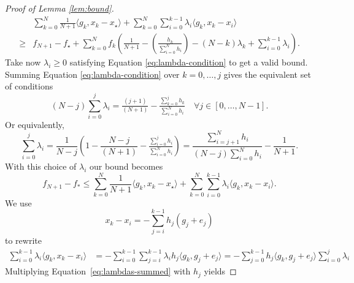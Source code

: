 \documentclass{article}
\begin{document}
\begin{toappendix}
\begin{proof}[Proof of Lemma \ref{lem:bound}]
\begin{align*}
  & \sum_{k=0}^N \frac{1}{N+1} \langle g_k , x_k - x_\star \rangle + \sum_{k=0}^N \sum_{i=0}^{k-1} \lambda_i \langle g_k, x_k-x_i\rangle \\
  \geq & f_{N+1} - f_\star +  \sum_{k=0}^N f_k\left(\frac{1}{N+1} -\left(\frac{h_k}{\sum_{i=0}^N h_i}\right) - (N-k)\lambda_k + \sum_{i=0}^{k-1} \lambda_i  \right).
\end{align*}
Take now $\lambda_i\ge0$ satisfying Equation \eqref{eq:lambda-condition} to get a valid bound.
Summing Equation \eqref{eq:lambda-condition} over $k=0,\dots, j$  gives the equivalent set of conditions
\[
  (N-j) \sum_{i=0}^{j} \lambda_i = \tfrac{(j+1)}{(N+1)} - \tfrac{\sum_{k=0}^{j}h_k}{\sum_{i=0}^N h_i} \quad \forall j\in [0, \dots, N-1].
\]
Or equivalently,
\begin{equation}\label{eq:lambdas-summed}
\sum_{i=0}^{j} \lambda_i = \frac{1}{N-j}\left(1-\frac{N-j}{(N+1)} - \tfrac{\sum_{i=0}^{j}h_i}{\sum_{i=0}^N h_i}\right)=\frac{\sum_{i=j+1}^{N}h_i}{(N-j)\sum_{i=0}^N h_i}-\frac1{N+1}.
\end{equation}
With this choice of $\lambda_i$ our bound becomes
\begin{equation}\label{eq:bound1}
f_{N+1}-f_*\le \sum_{k=0}^N \frac{1}{N+1} \langle g_k , x_k - x_\star \rangle + \sum_{k=0}^N \sum_{i=0}^{k-1} \lambda_i \langle g_k, x_k-x_i\rangle.
\end{equation}
We use
\begin{equation}
  \label{eq:linearity-iterations}
  x_k-x_i=-\sum_{j=i}^{k-1}h_j (g_j+e_j)
\end{equation}
to rewrite
\begin{align}
\sum_{i=0}^{k-1} \lambda_i \langle g_k, x_k-x_i\rangle
&=-\sum_{i=0}^{k-1} \sum_{j=i}^{k-1} \lambda_i h_j \langle g_k, g_j+e_j\rangle=-\sum_{j=0}^{k-1}h_j\langle g_k, g_j+e_j\rangle\sum_{i=0}^j\lambda_i
\label{eq:gradient-inner-product}
\end{align}
Multiplying Equation~\eqref{eq:lambdas-summed} with $h_j$ yields

\end{proof}
\end{toappendix}
\end{document}
